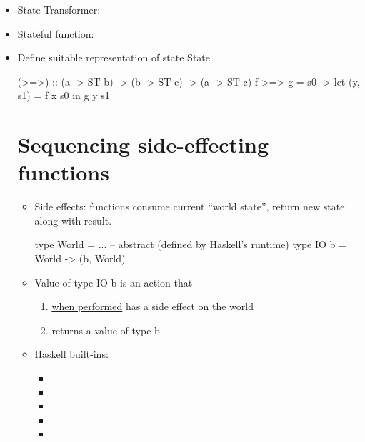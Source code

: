 \begin{itemize}
    \item State Transformer: 
    \item Stateful function: 
    \item Define suitable representation of state State
\begin{codebox}[haskell]
(>=>) :: (a -> ST b) -> (b -> ST c) -> (a -> ST c)
f >=> g = \x s0 -> let (y, s1) = f x s0
                   in g y s1
\end{codebox}



\section*{Sequencing side-effecting functions }

\begin{itemize}
    \item Side effects: functions consume current ``world state'', return new state along with result.
\begin{codebox}[haskell]
type World = ... -- abstract (defined by Haskell's runtime)
type IO b = World -> (b, World)
\end{codebox}
    \item Value of type IO b is an action that
    \begin{enumerate}
        \item \underline{when performed} has a side effect on the world
        \item returns a value of type b
    \end{enumerate}
    \item Haskell built-ins:
    \begin{itemize}
        \item {}
        \item {}
        \item {}
        \item {}
        \item {}
    \end{itemize}
\end{itemize}



\end{itemize}
